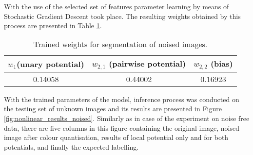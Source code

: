 With the use of the selected set of features parameter learning by means of Stochastic Gradient Descent took place. The resulting weights obtained by this process are presented in Table \ref{table:weights_nonlinear_noised}.
\begin{table}[ht]
\caption{Trained weights for segmentation of noised images.}
\centering
\begin{tabular}{|c|c|c|}
\hline
\rowcolor[HTML]{C0C0C0} 
$w_1$(unary potential) & $w_{2,1}$ (pairwise potential) & $w_{2,2}$ (bias) \\ \hline
0.14058 & 0.44002 & 0.16923 \\ \hline
\end{tabular}
\label{table:weights_nonlinear_noised}
\end{table}

With the trained parameters of the model, inference process was conducted on the testing set of unknown images and its results are presented in Figure \ref{fig:nonlinear_results_noised}. Similarly as in case of the experiment on noise free data, there are five columns in this figure containing the original image, noised image after colour quantisation, results of local potential only and for both potentials, and finally the expected labelling. 

